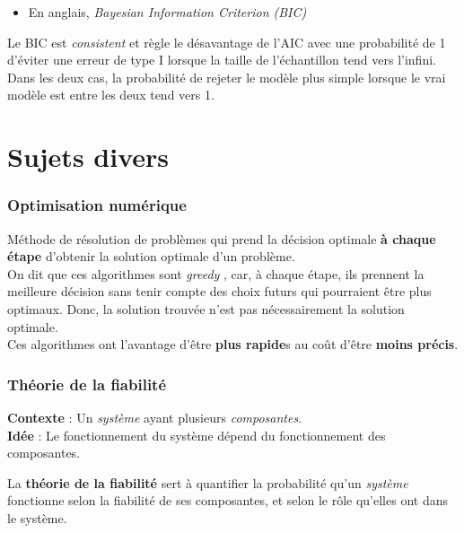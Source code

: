 \documentclass[10pt, french]{article}
\begin{document}
\begin{multicols*}{2}
\begin{definitionNOHFILLsub}
\begin{itemize}
	\item	En anglais, \og \textit{Bayesian Information Criterion (BIC)} \fg{}
\end{itemize}
\end{definitionNOHFILLsub}

Le BIC est \og \textit{consistent} \fg{} et règle le désavantage de l'AIC avec une probabilité de 1 d'éviter une erreur de type I lorsque la taille de l'échantillon tend vers l'infini. \\

Dans les deux cas, la probabilité de rejeter le modèle plus simple lorsque le vrai modèle est entre les deux tend vers 1. 


\pagebreak
\part{Sujets divers}
\section{Optimisation numérique}
\begin{definitionNOHFILLsub}
Méthode de résolution de problèmes qui prend la décision optimale \textbf{à chaque étape} d'obtenir la solution optimale d'un problème. \\

On dit que ces algorithmes sont \og \textit{greedy} \fg{}, car, à chaque étape, ils prennent la meilleure décision sans tenir compte des choix futurs qui pourraient être plus optimaux. Donc, la solution trouvée n'est pas nécessairement la solution optimale. \\

Ces algorithmes ont l'avantage d'être \textbf{plus rapide}s au coût d'être \textbf{moins précis}.
\end{definitionNOHFILLsub}


\pagebreak
\section{Théorie de la fiabilité}
\begin{definitionNOHFILL}
\textbf{Contexte} : Un \textit{système} ayant plusieurs \textit{composantes}.	 \\
\textbf{Idée} : Le fonctionnement du système dépend du fonctionnement des composantes.

La \textbf{théorie de la fiabilité} sert à quantifier la probabilité qu'un \textit{système} fonctionne selon la fiabilité de ses composantes, et selon le rôle qu'elles ont dans le système.
\end{definitionNOHFILL}


\end{multicols*}
\end{document}
